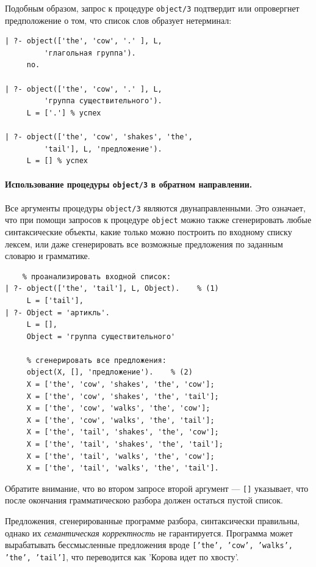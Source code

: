 \documentclass[12pt, openany, twoside]{book} %
\begin{document}
Подобным образом, запрос к процедуре {\tt object/3} подтвердит или опровергнет предположение о том, что список слов образует нетерминал:

{\tt\begin{verbatim}
| ?- object(['the', 'cow', '.' ], L,
         'глагольная группа').
     no.

| ?- object(['the', 'cow', '.' ], L,
         'группа существительного').
     L = ['.'] % успех

| ?- object(['the', 'cow', 'shakes', 'the',
         'tail'], L, 'предложение').
     L = [] % успех
\end{verbatim}}

\paragraph{Использование процедуры {\tt object/3} в обратном направлении.}

Все аргументы процедуры {\tt object/3} являются двунаправленными. Это означает, что при помощи запросов к процедуре {\tt object} можно также сгенерировать любые синтаксические объекты, какие только можно построить по входному списку лексем, или даже сгенерировать все возможные предложения по заданным словарю и грамматике.

{\tt\begin{verbatim}
    % проанализировать входной список:
| ?- object(['the', 'tail'], L, Object).    % (1)
     L = ['tail'],
| ?- Object = 'артикль'.
     L = [],
     Object = 'группа существительного'

     % сгенерировать все предложения:
     object(Х, [], 'предложение').    % (2)
     X = ['the', 'cow', 'shakes', 'the', 'cow'];
     X = ['the', 'cow', 'shakes', 'the', 'tail'];
     X = ['the', 'cow', 'walks', 'the', 'cow'];
     X = ['the', 'cow', 'walks', 'the', 'tail'];
     X = ['the', 'tail', 'shakes', 'the', 'cow'];
     X = ['the', 'tail', 'shakes', 'the', 'tail'];
     X = ['the', 'tail', 'walks', 'the', 'cow'];
     X = ['the', 'tail', 'walks', 'the', 'tail'].
\end{verbatim}}

Обратите внимание, что во втором запросе второй аргумент --- {\tt []} указывает, что после окончания грамматическою разбора должен остаться пустой список.

Предложения, сгенерированные программе разбора, синтаксически правильны, однако их \emph{семантическая корректность} не гарантируется. Программа может вырабатывать бессмысленные предложения вроде {\tt  ['the', 'cow', 'walks', 'the', 'tail']}, что переводится как 'Корова идет по хвосту'.
\end{document}
